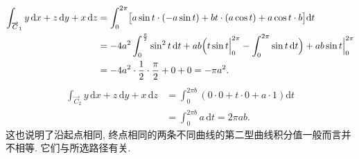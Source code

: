 \begin{solution}
\[
\begin{aligned}
\int_{\overrightarrow{C}_{1}}y\,\mathrm{d}x+z\,\mathrm{d}y+x\,\mathrm{d}z&=\int_{0}^{2\pi}\bigl[a\sin t\cdot(-a\sin t)+bt\cdot(a\cos t)+a\cos t\cdot b\bigr]\mathrm{d}t\\
&=-4a^{2}\int_{0}^{\frac{\pi}{2}}\sin^{2}t\,\mathrm{d}t+ab\Bigl(t\sin t\Big|_{0}^{2\pi}-\int_{0}^{2\pi}\sin t\,\mathrm{d}t\Bigr)+ab\sin t\Big|_{0}^{2\pi}\\
&=-4a^{2}\cdot\frac{1}{2}\cdot\frac{\pi}{2}+0+0=-\pi a^{2}.
\end{aligned}
\]
\[
\begin{aligned}
\int_{\overrightarrow{C}_{2}}y\,\mathrm{d}x+z\,\mathrm{d}y+x\,\mathrm{d}z&=\int_{0}^{2\pi b}(0\cdot0+t\cdot0+a\cdot1)\mathrm{d}t\\
&=\int_{0}^{2\pi b}a\,\mathrm{d}t=2\pi a b.
\end{aligned}
\]
这也说明了沿起点相同, 终点相同的两条不同曲线的第二型曲线积分值一般而言并不相等. 它们与所选路径有关.
\end{solution}

